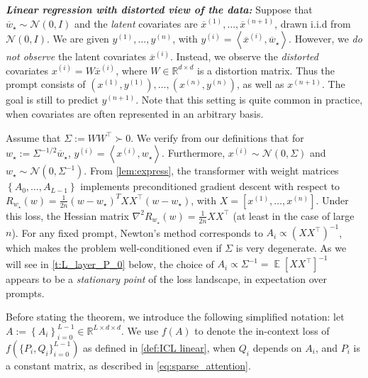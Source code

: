 \documentclass{article}
\DeclareMathOperator{\E}{\mathbb{E}}
\newcommand{\N}{\mathcal{N}}
\newcommand{\R}{\mathbb{R}}
\newcommand{\wstar}{w_\star}
\newcommand{\tx}[1]{x^{(#1)}}
\newcommand{\ty}[1]{y^{(#1)}}
\newcommand{\emphh}[1]{\textbf{\emph{#1}}}
\newcommand*\lin[1]{\left\langle #1 \right\rangle}
\newcommand*\lrb[1]{\left[ #1 \right]}
\newcommand*\lrp[1]{\left( #1 \right)}
\newcommand*\lrbb[1]{\left\{ #1 \right\}}
\begin{document}
\emphh{Linear regression with distorted view of the data:} Suppose that $\overline{w}_\star \sim \mathcal{N}(0,I)$ and the \emph{latent} covariates are $\overline{x}^{(1)},\dots,\overline{x}^{(n+1)}$, drawn i.i.d from $\N(0,I)$. We are given $\ty{1},\dots,\ty{n}$, with $\ty{i} = \lin{\overline{x}^{(i)}, \overline{w}_\star}$. However, we \emph{do not observe} the latent covariates $\overline{x}^{(i)}$. Instead, we observe the \emph{distorted} covariates $\tx{i} = W \overline{x}^{(i)}$, where $W\in \R^{d\times d}$ is a distortion matrix. Thus the prompt consists of $(\tx{1},\ty{1}),\dots,(\tx{n},\ty{n})$, as well as $\tx{n+1}$. The goal is still to predict $\ty{n+1}$. Note that this setting is quite common in practice, when covariates are often represented in an arbitrary basis. 

Assume that $\Sigma := W W^\top \succ 0$. We verify from our definitions that for $\wstar := \Sigma^{-1/2} \overline{w}_\star$, $\ty{i} = \lin{\tx{i},\wstar}$. Furthermore, $\tx{i} \sim \N(0, \Sigma)$ and $\wstar \sim \N(0, \Sigma^{-1})$. From \autoref{lem:express}, the transformer with weight matrices $\lrbb{A_0,\dots,A_{L-1}}$ implements preconditioned gradient descent with respect to $R_{\wstar}(w) = \frac{1}{2n} (w - \wstar)^T X X^\top (w-\wstar)$, with $X = \lrb{\tx{1}, \dots, \tx{n}}$. Under this loss, the Hessian matrix $\nabla^2 R_{\wstar}(w) = \frac{1}{2n} X X^\top$ (at least in the case of large $n$). For any fixed prompt, Newton's method corresponds to $A_i \propto \lrp{X X^\top}^{-1}$, which makes the problem well-conditioned even if $\Sigma$ is very degenerate. As we will see in \autoref{t:L_layer_P_0} below, the choice of $A_i \propto \Sigma^{-1} = \E\lrb{X X^\top}^{-1}$ appears to be a \emph{stationary point} of the loss landscape, in expectation over prompts.


Before stating the theorem, we introduce the following simplified notation: let $A := \lrbb{A_i}_{i=0}^{L-1} \in \R^{L \times d \times d}$. We use $f(A)$ to denote the in-context loss of $f\left(\{P_i, Q_i\}^{L-1}_{i=0}\right)$ as defined in \eqref{def:ICL linear}, when $Q_i$ depends on $A_i$, and $P_i$ is a constant matrix, as described in \eqref{eq:sparse_attention}.
\end{document}
